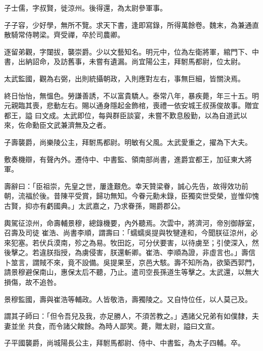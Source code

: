\begin{pinyinscope}
 子士儒，字叔賢，徙涼州。後得還，為太尉參軍事。



 子子容，少好學，無所不覽。求天下書，逢即寫錄，所得萬餘卷。魏末，為兼通直散騎常侍聘梁。齊受禪，卒於司農卿。



 逐留弟觀，字闥拔，襲崇爵。少以文藝知名。明元中，位為左衛將軍，綰門下、中書，出納詔命，及訪舊事，未嘗有遺漏。尚宜陽公主，拜駙馬都尉，位太尉。



 太武監國，觀為右弼，出則統攝朝政，入則應對左右，事無巨細，皆關決焉。



 終日怡怡，無慍色。勞謙善誘，不以富貴驕人。泰常八年，暴疾薨，年三十五。明元親臨其喪，悲動左右。賜以通身隱起金飾棺，喪禮一依安城王叔孫俊故事。贈宜都王，謚
 曰文成。太武即位，每與群臣談宴，未嘗不歎息殷勤，以為自道武以來，佐命勳臣文武兼濟無及之者。



 子壽襲爵，尚樂陵公主，拜駙馬都尉。明敏有父風。太武愛重之，擢為下大夫。



 敷奏機辯，有聲內外。遷侍中、中書監、領南部尚書，進爵宜都王，加征東大將軍。



 壽辭曰：「臣祖崇，先皇之世，屢逢艱危。幸天贊梁眷，誠心先告，故得效功前朝，流福於後。昔陳平受賞，歸功無知。今眷元勳未錄，臣獨奕世受榮，豈惟仰愧古賢，抑亦有虧國典。」太武嘉之，乃求眷孫，賜爵郡公。



 輿駕征涼州，命壽輔景穆，總錄機要，內外聽焉。次雲中，將濟河，帝別御靜室，召壽及司徒
 崔浩、尚書李順，謂壽曰：「蠕蠕吳提與牧犍連和，今聞朕征涼州，必來犯塞。若伏兵漠南，殄之為易。牧田訖，可分伏要害，以待虜至；引使深入，然後擊之。若違朕指授，為虜侵害，朕還斬卿。崔浩、李順為證，非虛言也。」壽信卜筮言，謂賊不來，竟不設備。吳提果至，京邑大駭。壽不知所為，欲築西郭門，請景穆避保南山，惠保太后不聽，乃止。遣司空長孫道生等擊之。太武還，以無大損傷，故不追咎。



 景穆監國，壽與崔浩等輔政。人皆敬浩，壽獨陵之。又自恃位任，以人莫己及。



 謂其子師曰：「但令吾兒及我，亦足勝人，不須苦教之。」遇諸父兄弟有如僕隸，夫妻並坐
 共食，而令諸父餕餘。為時人鄙笑。薨，贈太尉，謚曰文宣。



 子平國襲爵，尚城陽長公主，拜駙馬都尉、侍中、中書監，為太子四輔。卒。




\end{pinyinscope}
